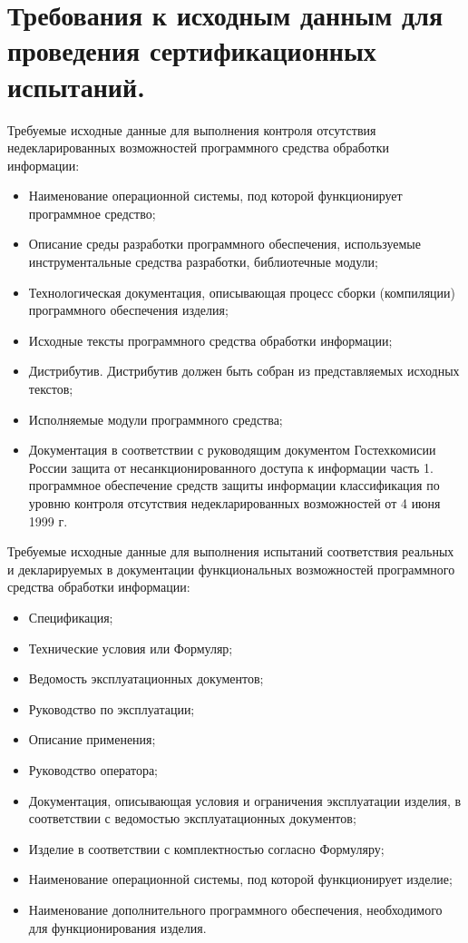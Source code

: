 \section{Требования к исходным данным для проведения сертификационных испытаний.}

Требуемые исходные данные для выполнения контроля отсутствия недекларированных возможностей программного средства обработки информации:

\begin{itemize}
	\item Наименование операционной системы, под которой функционирует программное средство;
	\item Описание среды разработки программного обеспечения, используемые инструментальные средства разработки, библиотечные модули;
	\item Технологическая документация, описывающая процесс сборки (компиляции) программного обеспечения изделия;
	\item Исходные тексты программного средства обработки информации;
	\item Дистрибутив. Дистрибутив должен быть собран из представляемых исходных текстов;
	\item Исполняемые модули программного средства;
	\item Документация в соответствии с руководящим документом Гостехкомисии России защита от несанкционированного доступа к информации часть 1. программное обеспечение средств защиты информации классификация по уровню контроля отсутствия недекларированных возможностей от 4 июня 1999 г.
\end{itemize}

Требуемые исходные данные для выполнения испытаний соответствия реальных и декларируемых в документации функциональных возможностей программного средства обработки информации:

\begin{itemize}
	\item Спецификация;
	\item Технические условия или Формуляр;
	\item Ведомость эксплуатационных документов;
	\item Руководство по эксплуатации;
	\item Описание применения;
	\item Руководство оператора;
	\item Документация, описывающая условия и ограничения эксплуатации изделия, в соответствии с ведомостью эксплуатационных документов;
	\item Изделие в соответствии с комплектностью согласно Формуляру;
	\item Наименование операционной системы, под которой функционирует изделие;
	\item Наименование дополнительного программного обеспечения, необходимого для функционирования изделия.
\end{itemize}

